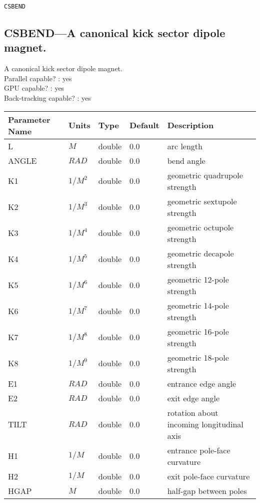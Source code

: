 \vspace*{0.5in}

\newpage
\begin{center}{\Large\verb|CSBEND|}\end{center}
\subsection{CSBEND---A canonical kick sector dipole magnet.}
A canonical kick sector dipole magnet.
\\
Parallel capable? : yes\\
GPU capable? : yes\\
Back-tracking capable? : yes\\
\begin{tabular}{|l|l|l|l|p{\descwidth}|} \hline
Parameter Name & Units & Type & Default & Description \\ \hline 
L & $M$ & double &  0.0 & arc length  \\ \hline 
ANGLE & $RAD$ & double &  0.0 & bend angle  \\ \hline 
K1 & $1/M^{2}$ & double &  0.0 & geometric quadrupole strength  \\ \hline 
K2 & $1/M^{3}$ & double &  0.0 & geometric sextupole strength  \\ \hline 
K3 & $1/M^{4}$ & double &  0.0 & geometric octupole strength  \\ \hline 
K4 & $1/M^{5}$ & double &  0.0 & geometric decapole strength  \\ \hline 
K5 & $1/M^{6}$ & double &  0.0 & geometric 12-pole strength  \\ \hline 
K6 & $1/M^{7}$ & double &  0.0 & geometric 14-pole strength  \\ \hline 
K7 & $1/M^{8}$ & double &  0.0 & geometric 16-pole strength  \\ \hline 
K8 & $1/M^{9}$ & double &  0.0 & geometric 18-pole strength  \\ \hline 
E1 & $RAD$ & double &  0.0 & entrance edge angle  \\ \hline 
E2 & $RAD$ & double &  0.0 & exit edge angle  \\ \hline 
TILT & $RAD$ & double &  0.0 & rotation about incoming longitudinal axis  \\ \hline 
H1 & $1/M$ & double &  0.0 & entrance pole-face curvature  \\ \hline 
H2 & $1/M$ & double &  0.0 & exit pole-face curvature  \\ \hline 
HGAP & $M$ & double &  0.0 & half-gap between poles  \\ \hline 

\end{tabular}
